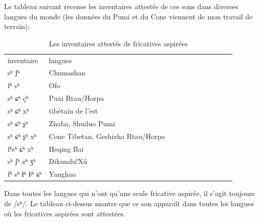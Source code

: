\documentclass[oldfontcommands,oneside,a4paper,11pt]{memoir}
\begin{document}
Le tableau suivant recense les inventaires attestés de ces sons dans diverses langues du monde (les données du Pumi et du Cone viennent de mon travail de terrain):
\begin{table}[H]
\caption{Les inventaires attestés de fricatives aspirées} \label{tab:aspirated}
\begin{tabular}{lllllllllll}  \toprule
inventaire	&	langues	\\
sʰ ʃʰ	&	Chumashan 	\\
fʰ sʰ	&	Ofo	\\
sʰ ɕʰ çʰ	&	Puxi Rtau/Horpa	\\
sʰ ɕʰ xʰ	&	tibétain de l'est	\\
sʰ ɕʰ ʂʰ	&	Zhaba, Shuiluo Pumi	\\
sʰ ɕʰ ʂʰ xʰ	&	Cone Tibetan, Geshizha Rtau/Horpa	\\
fʰsʰ ɕʰ xʰ	&	Heqing Bai	\\
sʰ ʃʰ zʱ ʒʱ	&	Dikundu!Xũ	\\
fʰ sʰ ɬʰ ɬʲʰ ɕʰ	&	Yanghao	\\
\bottomrule
\end{tabular}
\end{table}
Dans toutes les langues qui n'ont qu'une seule fricative aspirée, il s'agit toujours de /sʰ/.  Le tableau ci-dessus montre que ce son apparaît dans toutes les langues où les fricatives aspirées sont attestées.
\end{document}
